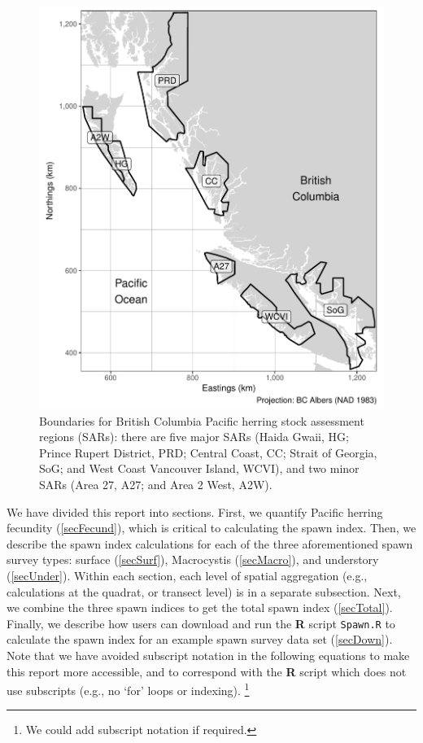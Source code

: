 \documentclass[12pt]{article}
\begin{document}
\begin{figure}
\centering
\includegraphics[width=\linewidth]{Figures/BC.pdf}
\caption[Boundaries for Pacific herring stock assessment regions (SARs)]
{Boundaries for British Columbia Pacific herring stock assessment regions (SARs): there are five major SARs (Haida Gwaii, HG; Prince Rupert District, PRD; Central Coast, CC; Strait of Georgia, SoG; and West Coast Vancouver Island, WCVI), and two minor SARs (Area 27, A27; and Area 2 West, A2W).}
\label{figBC}
\end{figure}

We have divided this report into sections.
First, we quantify Pacific herring fecundity (\autoref{secFecund}), which is critical to calculating the spawn index.
Then, we describe the spawn index calculations for each of the three aforementioned spawn survey types: surface (\autoref{secSurf}), Macrocystis (\autoref{secMacro}), and understory (\autoref{secUnder}).
Within each section, each level of spatial aggregation (e.g., calculations at the quadrat, or transect level) is in a separate subsection.
Next, we combine the three spawn indices to get the total spawn index (\autoref{secTotal}).
Finally, we describe how users can download and run the \textbf{R} script \texttt{Spawn.R} to calculate the spawn index for an example spawn survey data set (\autoref{secDown}).
Note that we have avoided subscript notation in the following equations to make this report more accessible, and to correspond with the \textbf{R} script which does not use subscripts (e.g., no `for' loops or indexing).%
\footnote{We could add subscript notation if required.}
\end{document}
